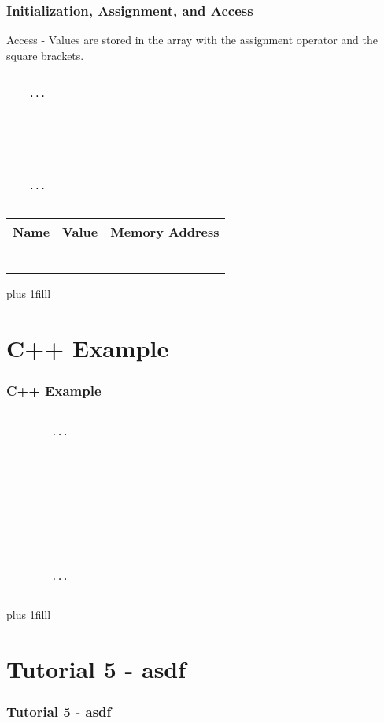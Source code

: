 \documentclass[fleqn]{beamer} %
\newcommand{\sectiontitleIII}{Initialization, Assignment, and Access}
\newcommand{\sectiontitleIV}{C++ Example}
\newcommand{\sectiontitleV}{Tutorial 5 - asdf }
\newcommand{\btVFill}{\vskip0pt plus 1filll}
\begin{document}
\begin{frame}[label=sectionIII,containsverbatim] \small
\frametitle{\sectiontitleIII}

Access - Values are stored in the array with the assignment operator and the square brackets.  \vspace{5mm}\\

\begin{multicols}{2}
	
	\begin{lstlisting}
	
	...
	
	
	
	
	
	
	...			
	
	\end{lstlisting}
	
	\renewcommand*{\arraystretch}{1.5}
	\begin{tabular}{c|c|c} 
		Name&Value&Memory Address\\ \hline
		& & \\ \hline
		& & \\ \hline
		& & \\ \hline
		& & \\ \hline
		& & \\ \hline
		& & \\ \hline
	\end{tabular}
	
	
	
\end{multicols}

\btVFill


\end{frame}

\section{\sectiontitleIV}	
	\begin{frame}[label=sectionIV,containsverbatim] \small
		\frametitle{\sectiontitleIV}    
	
		\begin{lstlisting}
		
		...
		
		
		
		
		
		
		
		
		
		
		...			
		
		\end{lstlisting}
		

		\btVFill
	\end{frame}

\section{\sectiontitleV}	
	\begin{frame}[label=sectionV,containsverbatim] \small
	\frametitle{\sectiontitleV}    
	

	\end{frame}
\end{document}
